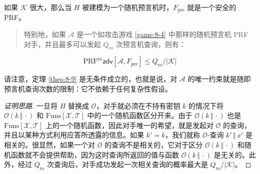 \begin{theorem}\label{theo:8-9}
如果 $\mathcal{K}$ 很大，那么当 $H$ 被建模为一个随机预言机时，$F_\mathrm{pre}$ 就是一个安全的 PRF。
\begin{quote}
特别地，如果 $\mathcal{A}$ 是一个如攻击游戏 \ref{game:8-4} 中那样的随机预言机 PRF 对手，并且最多可以发起 $Q_\mathrm{ro}$ 次预言机查询，则有：
\end{quote}
\[
\mathrm{PRF}^\mathrm{ro}\mathsf{adv}[\mathcal{A},F_\mathrm{pre}]
\leq
Q_\mathrm{ro}/|\mathcal{K}|
\]
\end{theorem}

请注意，定理 \ref{theo:8-9} 是无条件成立的，也就是说，对 $\mathcal{A}$ 的唯一约束就是随即预言机查询次数的限制：它不依赖于任何复杂性假设。

\begin{proof}[证明思路]
一旦将 $H$ 替换成 $\mathcal{O}$，对手就必须在不持有密钥 $k$ 的情况下将 $\mathcal{O}(k\,\Vert\,\cdot)$ 和 $\mathrm{Funs}[\mathcal{X},\mathcal{T}]$ 中的一个随机函数区分开来。由于 $\mathcal{O}(k\,\Vert\,\cdot)$ 也是 $\mathrm{Funs}[\mathcal{X},\mathcal{T}]$ 上的一个随机函数，因此对手唯一的希望，就是发起对 $\mathcal{O}$ 的查询，并且以某种方式利用应答所透露的信息。如果 $k'=k$，我们就称 $\mathcal{O}$-查询 $k'\,\Vert\,x'$ 是相关的。很显然，如果一个对 $\mathcal{O}$ 的查询不是相关的，它对于区分 $\mathcal{O}(k\,\Vert\,\cdot)$ 和随机函数就不会提供帮助，因为这时查询所返回的值与函数 $\mathcal{O}(k\,\Vert\,\cdot)$ 是无关的。此外，经过 $Q_\mathrm{ro}$ 次查询后，对手成功发起一次相关查询的概率最大是 $Q_\mathrm{ro}/|\mathcal{K}|$。
\end{proof}

